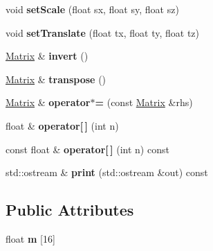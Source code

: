 \begin{CompactItemize}
\item 
\hypertarget{classm3g_1_1Matrix_937d04042c25021532ea2532fe5e3a32}{
void \textbf{setScale} (float sx, float sy, float sz)}
\label{classm3g_1_1Matrix_937d04042c25021532ea2532fe5e3a32}

\item 
\hypertarget{classm3g_1_1Matrix_550cf39dca5ec8d74d719b0dcdecdd4b}{
void \textbf{setTranslate} (float tx, float ty, float tz)}
\label{classm3g_1_1Matrix_550cf39dca5ec8d74d719b0dcdecdd4b}

\item 
\hypertarget{classm3g_1_1Matrix_f26a87130b4bbc951b85074a8c308a0e}{
\hyperlink{classm3g_1_1Matrix}{Matrix} \& \textbf{invert} ()}
\label{classm3g_1_1Matrix_f26a87130b4bbc951b85074a8c308a0e}

\item 
\hypertarget{classm3g_1_1Matrix_d27ed380c287f6489575eb838010cf72}{
\hyperlink{classm3g_1_1Matrix}{Matrix} \& \textbf{transpose} ()}
\label{classm3g_1_1Matrix_d27ed380c287f6489575eb838010cf72}

\item 
\hypertarget{classm3g_1_1Matrix_5d28596666a27f88d74bacceaef9b326}{
\hyperlink{classm3g_1_1Matrix}{Matrix} \& \textbf{operator$\ast$=} (const \hyperlink{classm3g_1_1Matrix}{Matrix} \&rhs)}
\label{classm3g_1_1Matrix_5d28596666a27f88d74bacceaef9b326}

\item 
\hypertarget{classm3g_1_1Matrix_014a3abc30da6ad739fcce9aa3fa28fe}{
float \& \textbf{operator\mbox{[}$\,$\mbox{]}} (int n)}
\label{classm3g_1_1Matrix_014a3abc30da6ad739fcce9aa3fa28fe}

\item 
\hypertarget{classm3g_1_1Matrix_7aa4dbded39fe1de76fbb0f81b57085e}{
const float \& \textbf{operator\mbox{[}$\,$\mbox{]}} (int n) const }
\label{classm3g_1_1Matrix_7aa4dbded39fe1de76fbb0f81b57085e}

\item 
\hypertarget{classm3g_1_1Matrix_6fea17fa1532df3794f8cb39cb4f911f}{
std::ostream \& \textbf{print} (std::ostream \&out) const }
\label{classm3g_1_1Matrix_6fea17fa1532df3794f8cb39cb4f911f}

\end{CompactItemize}
\subsection*{Public Attributes}
\begin{CompactItemize}
\item 
\hypertarget{classm3g_1_1Matrix_68147cce833d98b698183d68629e38d5}{
float \textbf{m} \mbox{[}16\mbox{]}}
\label{classm3g_1_1Matrix_68147cce833d98b698183d68629e38d5}

\end{CompactItemize}


